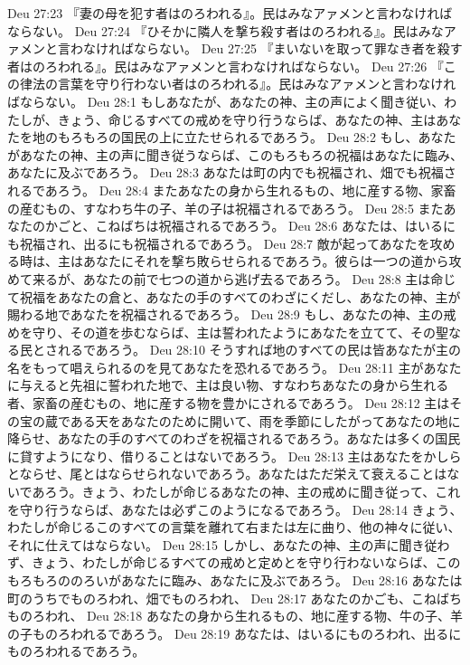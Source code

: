 Deu 27:23  『妻の母を犯す者はのろわれる』。民はみなアァメンと言わなければならない。
Deu 27:24  『ひそかに隣人を撃ち殺す者はのろわれる』。民はみなアァメンと言わなければならない。
Deu 27:25  『まいないを取って罪なき者を殺す者はのろわれる』。民はみなアァメンと言わなければならない。
Deu 27:26  『この律法の言葉を守り行わない者はのろわれる』。民はみなアァメンと言わなければならない。
Deu 28:1  もしあなたが、あなたの神、主の声によく聞き従い、わたしが、きょう、命じるすべての戒めを守り行うならば、あなたの神、主はあなたを地のもろもろの国民の上に立たせられるであろう。
Deu 28:2  もし、あなたがあなたの神、主の声に聞き従うならば、このもろもろの祝福はあなたに臨み、あなたに及ぶであろう。
Deu 28:3  あなたは町の内でも祝福され、畑でも祝福されるであろう。
Deu 28:4  またあなたの身から生れるもの、地に産する物、家畜の産むもの、すなわち牛の子、羊の子は祝福されるであろう。
Deu 28:5  またあなたのかごと、こねばちは祝福されるであろう。
Deu 28:6  あなたは、はいるにも祝福され、出るにも祝福されるであろう。
Deu 28:7  敵が起ってあなたを攻める時は、主はあなたにそれを撃ち敗らせられるであろう。彼らは一つの道から攻めて来るが、あなたの前で七つの道から逃げ去るであろう。
Deu 28:8  主は命じて祝福をあなたの倉と、あなたの手のすべてのわざにくだし、あなたの神、主が賜わる地であなたを祝福されるであろう。
Deu 28:9  もし、あなたの神、主の戒めを守り、その道を歩むならば、主は誓われたようにあなたを立てて、その聖なる民とされるであろう。
Deu 28:10  そうすれば地のすべての民は皆あなたが主の名をもって唱えられるのを見てあなたを恐れるであろう。
Deu 28:11  主があなたに与えると先祖に誓われた地で、主は良い物、すなわちあなたの身から生れる者、家畜の産むもの、地に産する物を豊かにされるであろう。
Deu 28:12  主はその宝の蔵である天をあなたのために開いて、雨を季節にしたがってあなたの地に降らせ、あなたの手のすべてのわざを祝福されるであろう。あなたは多くの国民に貸すようになり、借りることはないであろう。
Deu 28:13  主はあなたをかしらとならせ、尾とはならせられないであろう。あなたはただ栄えて衰えることはないであろう。きょう、わたしが命じるあなたの神、主の戒めに聞き従って、これを守り行うならば、あなたは必ずこのようになるであろう。
Deu 28:14  きょう、わたしが命じるこのすべての言葉を離れて右または左に曲り、他の神々に従い、それに仕えてはならない。
Deu 28:15  しかし、あなたの神、主の声に聞き従わず、きょう、わたしが命じるすべての戒めと定めとを守り行わないならば、このもろもろののろいがあなたに臨み、あなたに及ぶであろう。
Deu 28:16  あなたは町のうちでものろわれ、畑でものろわれ、
Deu 28:17  あなたのかごも、こねばちものろわれ、
Deu 28:18  あなたの身から生れるもの、地に産する物、牛の子、羊の子ものろわれるであろう。
Deu 28:19  あなたは、はいるにものろわれ、出るにものろわれるであろう。
